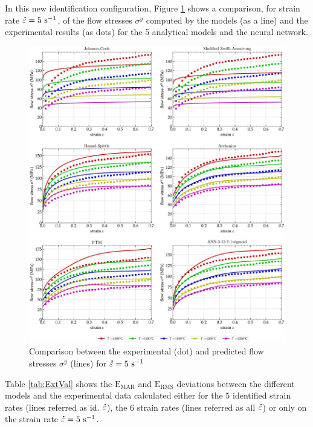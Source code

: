 \documentclass[twoside,english,1p,final,sort&compress]{elsarticle}
\theoremstyle{plain}
\DeclareRobustCommand{\mdot}[1]{\accentset{\mbox{\bfseries .}}{#1}}
\DeclareRobustCommand{\RMSE}{\text{E}_\text{RMS}}
\DeclareRobustCommand{\MARE}{\text{E}_\text{MAR}}
\DeclareRobustCommand{\ps}{\text{s}^{-1}}
\begin{document}
In this new identification configuration, Figure \ref{fig:CompExt} shows a comparison, for strain rate $\mdot\varepsilon=5~\ps$, of the flow stresses $\sigma^y$ computed by the models (as a line) and the experimental results (as dots) for the 5 analytical models and the neural network.
\begin{figure}[!ht]
\centering
\includegraphics[width=\columnwidth]
{Figures/CompExt}
\caption{Comparison between the experimental (dot) and predicted flow stresses $\sigma^y$ (lines) for $\mdot\varepsilon=5~\ps$}
\label{fig:CompExt}
\end{figure}
Table \ref{tab:ExtVal} shows the $\MARE$ and $\RMSE$ deviations between the different models and the experimental data calculated either for the $5$ identified strain rates (lines referred as id. $\mdot\varepsilon$), the $6$ strain rates (lines referred as all $\mdot\varepsilon$) or only on the strain rate $\mdot\varepsilon=5~\ps$.
\end{document}

